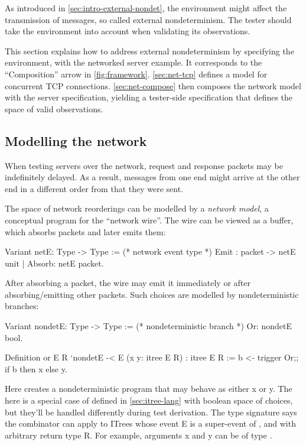 As introduced in \autoref{sec:intro-external-nondet}, the environment might
affect the transmission of messages, so called external nondeterminism.  The
tester should take the environment into account when validating its
observations.

This section explains how to address external nondeterminism by specifying the
environment, with the networked server example.  It corresponds to the
``Composition'' arrow in \autoref{fig:framework}.  \autoref{sec:net-tcp} defines
a model for concurrent TCP connections.  \autoref{sec:net-compose} then composes
the network model with the server specification, yielding a tester-side
specification that defines the space of valid observations.

\subsection{Modelling the network}
\label{sec:net-tcp}
When testing servers over the network, request and response packets may be
indefinitely delayed.  As a result, messages from one end might arrive at the
other end in a different order from that they were sent.

The space of network reorderings can be modelled by a {\em network model}, a
conceptual program for the ``network wire''.  The wire can be viewed as a
buffer, which absorbs packets and later emits them:
\begin{coq}
  Variant netE: Type -> Type := (* network event type *)
    Emit  : packet -> netE unit
  | Absorb: netE packet.
\end{coq}

After absorbing a packet, the wire may emit it immediately or after
absorbing/emitting other packets.  Such choices are modelled by nondeterministic
 branches:
\begin{coq}
  Variant nondetE: Type -> Type := (* nondeterministic branch *)
    Or: nondetE bool.

  Definition or {E R} `{nondetE -< E} (x y: itree E R) : itree E R :=
    b <- trigger Or;;
    if b then x else y.
\end{coq}

Here  creates a nondeterministic program that may behave as either
\ilc x or \ilc y.  The  here is a special case of 
defined in \autoref{sec:itree-lang} with boolean space of choices, but they'll
be handled differently during test derivation.  The type signature  says the  combinator can apply to ITrees whose
event \ilc E is a super-event of , and with arbitrary return type
\ilc R.  For example, arguments \ilc x and \ilc y can be of type .

